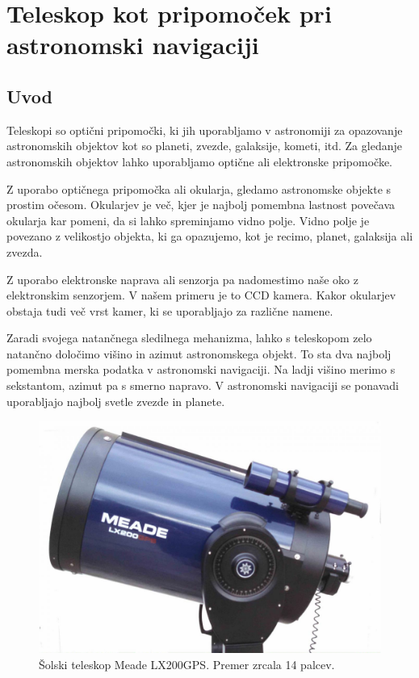 %
\chapter{Teleskop kot pripomoček pri astronomski navigaciji}
\label{sec:v_teleskop} 
%
\section{Uvod}
Teleskopi so optični pripomočki, ki jih uporabljamo v astronomiji za opazovanje astronomskih objektov kot so planeti, zvezde, galaksije, kometi, itd. Za gledanje astronomskih objektov lahko uporabljamo optične ali elektronske pripomočke.

Z uporabo optičnega pripomočka ali okularja, gledamo astronomske objekte s prostim očesom. Okularjev je več, kjer je najbolj pomembna lastnost povečava okularja kar pomeni, da si lahko spreminjamo vidno polje. Vidno polje je povezano z velikostjo objekta, ki ga opazujemo, kot je recimo, planet, galaksija ali zvezda.

Z uporabo elektronske naprava ali senzorja pa nadomestimo naše oko z elektronskim senzorjem. V našem primeru je to CCD kamera. Kakor okularjev obstaja tudi več vrst kamer, ki se uporabljajo za različne namene. 
  
Zaradi svojega natančnega sledilnega mehanizma, lahko s teleskopom zelo natančno določimo višino in azimut astronomskega objekt. To sta dva najbolj pomembna merska podatka v astronomski navigaciji. Na ladji višino merimo s sekstantom, azimut pa s smerno napravo. V astronomski navigaciji se ponavadi uporabljajo najbolj svetle zvezde in planete. 

\begin{figure}[tb]
	\begin{center}
		\includegraphics[width=12cm]{Vaje/Teleskop/figs/meade_lx200gps.png}
	\end{center}
\caption{Šolski teleskop Meade LX200GPS. Premer zrcala 14 palcev.}
\end{figure}

